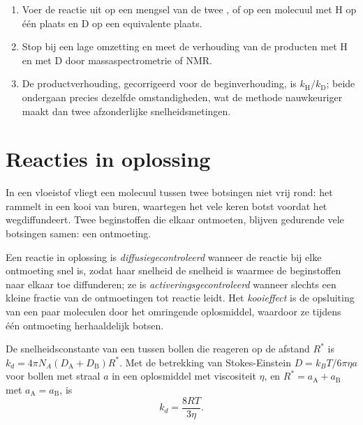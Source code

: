 \begin{method}\label{met:b3:rate-theories:kie}
\begin{enumerate}
  \item Voer de reactie uit op een mengsel van de twee , of op
        een molecuul met H op één plaats en D op een equivalente plaats.
  \item Stop bij een lage omzetting en meet de verhouding van de producten
        met H en met D door massaspectrometrie of NMR.
  \item De productverhouding, gecorrigeerd voor de beginverhouding, is
        $k_{\mathrm H}/k_{\mathrm D}$; beide  ondergaan precies
        dezelfde omstandigheden, wat de methode nauwkeuriger maakt dan twee
        afzonderlijke snelheidsmetingen.
\end{enumerate}
\end{method}

\section{Reacties in oplossing}

In een vloeistof vliegt een molecuul tussen twee botsingen niet vrij rond:
het rammelt in een kooi van buren, waartegen het vele keren botst voordat
het wegdiffundeert. Twee beginstoffen die elkaar ontmoeten, blijven
gedurende vele botsingen samen: een ontmoeting.

\begin{definition}\label{def:b3:rate-theories:diffusion}
Een reactie in oplossing is
\emph{diffusiegecontroleerd}
wanneer de reactie bij elke ontmoeting snel is, zodat haar snelheid de
snelheid is waarmee de beginstoffen naar elkaar toe diffunderen; ze is
\emph{activeringsgecontroleerd}
wanneer slechts een kleine fractie van de ontmoetingen tot reactie leidt.
Het \emph{kooieffect}
is de opsluiting van een paar moleculen door het omringende oplosmiddel,
waardoor ze tijdens één ontmoeting herhaaldelijk botsen.
\end{definition}

\begin{proposition}\label{prop:b3:rate-theories:smoluchowski}
De snelheidsconstante van een  tussen bollen
die reageren op de afstand $R^*$ is $k_d = 4\pi N_A(D_{\mathrm A} + D_{\mathrm B})R^*$. Met de betrekking van
Stokes-Einstein
$D = k_BT/6\pi\eta a$ voor bollen met straal $a$ in een oplosmiddel met
viscositeit $\eta$, en $R^* = a_{\mathrm A} + a_{\mathrm B}$ met $a_{\mathrm A} = a_{\mathrm B}$, is
\[
  k_d = \frac{8RT}{3\eta} .
\]
\end{proposition}

